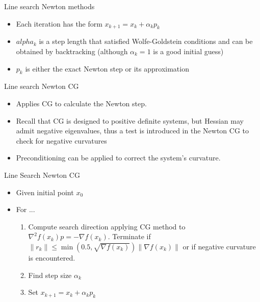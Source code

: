 \documentclass{beamer}
\begin{document}
\begin{frame}[allowframebreaks]{Line search Newton methods}
	\begin{itemize}
		\item Each iteration has the form $x_{k+1} = x_k + \alpha_k p_k$
		\item $alpha_k$ is a step length that satisfied Wolfe-Goldstein conditions and can be obtained by backtracking (although $\alpha_k=1$ is a good initial guess)
		\item $p_k$ is either the exact Newton step or its approximation
	\end{itemize}

	Line search Newton CG
	\begin{itemize}
		\item Applies CG to calculate the Newton step.
		\item Recall that CG is designed to positive definite systems, but Hessian may admit negative eigenvalues, thus a test is introduced in the Newton CG to check for negative curvatures
		\item Preconditioning can be applied to correct the system's curvature.
	\end{itemize}

	\begin{block}{Line Search Newton CG}
		\begin{itemize}
			\item Given initial point $x_0$
			\item For ...
			\begin{enumerate}
				\item Compute search direction applying CG method to $\nabla^2 f(x_k) p = -\nabla f(x_k)$. Terminate if $\|r_k\| \leq \min (0.5, \sqrt{\nabla f(x_k)}) \|\nabla f(x_k)\|$ or if negative curvature is encountered.
				\item Find step size $\alpha_k$
				\item Set $x_{k+1} = x_k + \alpha_k p_k$ 
			\end{enumerate}
		\end{itemize}
	\end{block}
\end{frame}
\end{document}
